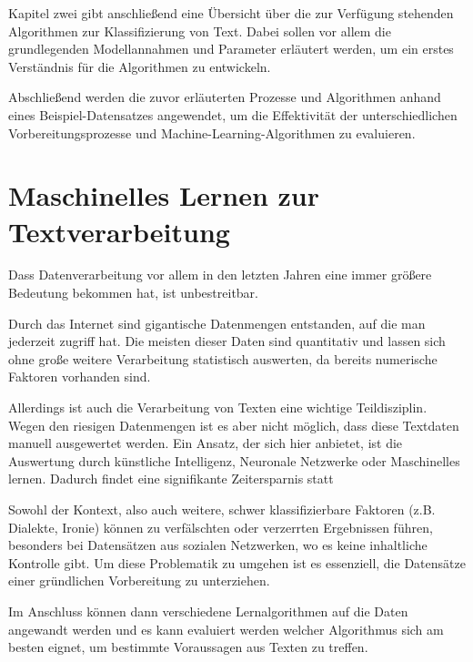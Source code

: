 \documentclass[a4paper,12pt]{article}
\begin{document}
Kapitel zwei gibt anschließend eine Übersicht über die zur Verfügung stehenden Algorithmen zur Klassifizierung von Text. Dabei sollen vor allem die grundlegenden Modellannahmen und Parameter erläutert werden, um ein erstes Verständnis für die Algorithmen zu entwickeln.

Abschließend werden die zuvor erläuterten Prozesse und Algorithmen anhand eines Beispiel-Datensatzes angewendet, um die Effektivität der unterschiedlichen Vorbereitungsprozesse und Machine-Learning-Algorithmen zu evaluieren. 


\pagestyle{fancy}
\setcounter{page}{5}
\fancyhf{}
\fancyhead[RO]{\textbf{\thepage}}


\newpage





\section{Maschinelles Lernen zur Textverarbeitung}


Dass Datenverarbeitung vor allem in den letzten Jahren eine immer größere Bedeutung bekommen hat, ist unbestreitbar.

Durch das Internet sind gigantische Datenmengen entstanden, auf die man jederzeit zugriff hat. Die meisten dieser Daten sind quantitativ und lassen sich ohne große weitere Verarbeitung statistisch auswerten, da bereits numerische Faktoren vorhanden sind. 

Allerdings ist auch die Verarbeitung von Texten eine wichtige Teildisziplin. Wegen den riesigen Datenmengen ist es aber nicht möglich, dass diese Textdaten manuell ausgewertet werden. Ein Ansatz, der sich hier anbietet, ist die Auswertung durch künstliche Intelligenz, Neuronale Netzwerke oder Maschinelles lernen. Dadurch findet eine signifikante Zeitersparnis statt

Sowohl der Kontext, also auch weitere, schwer klassifizierbare Faktoren (z.B. Dialekte, Ironie) können zu verfälschten oder verzerrten Ergebnissen führen, besonders bei Datensätzen aus sozialen Netzwerken, wo es keine inhaltliche Kontrolle gibt. Um diese Problematik zu umgehen ist es essenziell, die Datensätze einer gründlichen Vorbereitung zu unterziehen. 

Im Anschluss können dann verschiedene Lernalgorithmen auf die Daten angewandt werden und es kann evaluiert werden welcher Algorithmus sich am besten eignet, um bestimmte Voraussagen aus Texten zu treffen. 
\end{document}
